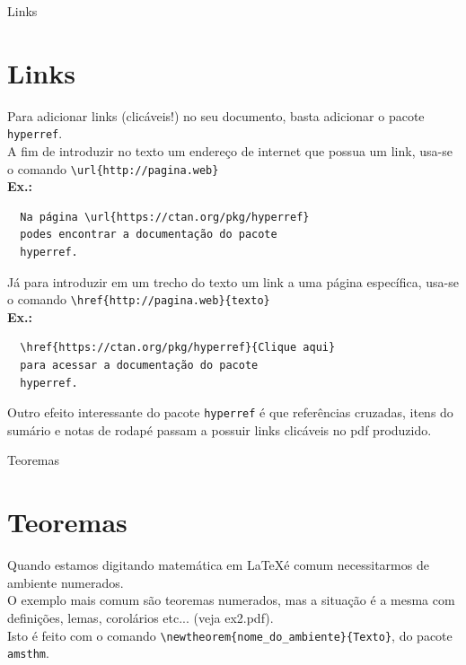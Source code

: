 \documentclass[12pt]{beamer}
\begin{document}
\begin{frame}[fragile]{Links}
  \section{Links}
  Para adicionar links (clicáveis!) no seu documento, basta adicionar o pacote \verb+hyperref+.\\
  
  A fim de introduzir no texto um endereço de internet que possua um link, usa-se o comando \verb+\url{http://pagina.web}+\\
  \medskip
  \textbf{Ex.:} 
  \begin{verbatim}  
  Na página \url{https://ctan.org/pkg/hyperref}
  podes encontrar a documentação do pacote
  hyperref.
  \end{verbatim}
\end{frame}

\begin{frame}[fragile]
  Já para introduzir em um trecho do texto um link a uma página específica, usa-se o comando \verb+\href{http://pagina.web}{texto}+\\
  \medskip
  \textbf{Ex.:}
  \begin{verbatim}
  \href{https://ctan.org/pkg/hyperref}{Clique aqui} 
  para acessar a documentação do pacote 
  hyperref.
  \end{verbatim}
  Outro efeito interessante do pacote \verb+hyperref+ é que referências cruzadas, itens do sumário e notas de rodapé passam a possuir links clicáveis no pdf produzido.
\end{frame}

\begin{frame}[fragile]{Teoremas}
  \section{Teoremas}
  Quando estamos digitando matemática em \LaTeX é comum necessitarmos de ambiente numerados. \\
  \medskip
  O exemplo mais comum são teoremas numerados, mas a situação é a mesma com definições, lemas, corolários etc... (veja ex2.pdf).\\
  \medskip
  Isto é feito com o comando \verb+\newtheorem{nome_do_ambiente}{Texto}+, do pacote \verb+amsthm+. 
\end{frame}
\end{document}
